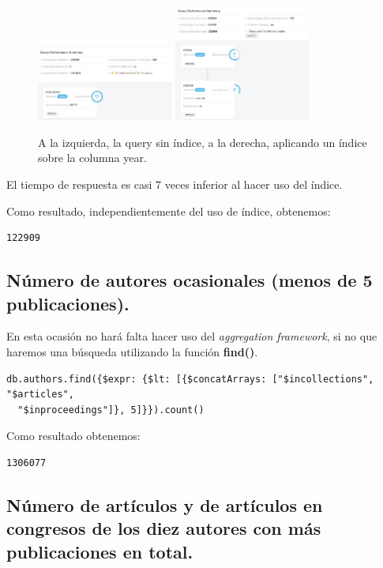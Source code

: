 \begin{figure}[H]
  \centering
    \centering
        \includegraphics[width=0.4\textwidth]{Figures/wo_year_idx}
        \includegraphics[width=0.4\textwidth]{Figures/year_idx}
  \caption{A la izquierda, la query sin índice, a la derecha, aplicando un índice sobre la columna year.}
\end{figure}

El tiempo de respuesta es casi 7 veces inferior al hacer uso del índice.

Como resultado, independientemente del uso de índice, obtenemos:

\begin{verbatim}
122909
\end{verbatim}

\subsection{Número de autores ocasionales (menos de 5 publicaciones).}

En esta ocasión no hará falta hacer uso del \textit{aggregation framework}, si no que haremos una búsqueda utilizando la función \textbf{find()}.

\begin{verbatim}
db.authors.find({$expr: {$lt: [{$concatArrays: ["$incollections", "$articles",
  "$inproceedings"]}, 5]}}).count()
\end{verbatim}


Como resultado obtenemos:

\begin{verbatim}
1306077
\end{verbatim}

\subsection{Número de artículos y de artículos en congresos de los diez autores con más publicaciones en total.}


